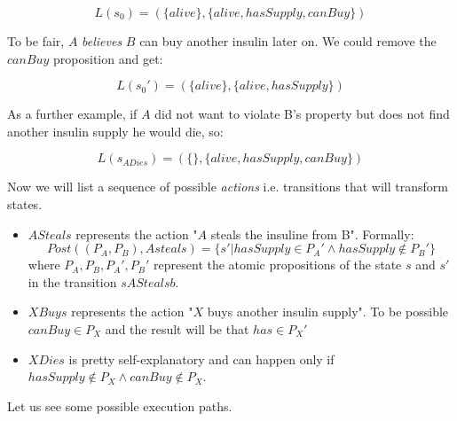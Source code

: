 \documentclass{article}
\begin{document}
\begin{equation*}
    L(s_0) = (\{alive\}, \{alive, hasSupply, canBuy\})
\end{equation*}

To be fair, $A$ \textit{believes} $B$ can buy another insulin later on. We could remove the $canBuy$ proposition and get:

\begin{equation*}
    L(s_0') = (\{alive\}, \{alive, hasSupply\})
\end{equation*}

As a further example, if $A$ did not want to violate B's property but does not find another insulin supply he would die, so:

\begin{equation*}
    L(s_{ADies}) = (\{\}, \{alive, hasSupply, canBuy\})
\end{equation*}

Now we will list a sequence of possible \textit{actions} i.e. transitions that will transform states.

\begin{itemize}
    \item $ASteals$ represents the action "$A$ steals the insuline from B". Formally:
    \begin{equation}
        Post((P_A, P_B), Asteals) = \{s' | hasSupply \in P_A' \wedge hasSupply \not \in P_B'\} 
    \end{equation}
    where $P_A, P_B, P_A', P_B'$ represent the atomic propositions of the state $s$ and $s'$ in the transition $s ASteals b$.
    \item $XBuys$ represents the action "$X$ buys another insulin supply". To be possible $canBuy \in P_X$ and the result will be that $has \in P_X'$
    \item $XDies$ is pretty self-explanatory and can happen only if $hasSupply \not \in P_X \wedge canBuy \not \in P_X$.
\end{itemize}

Let us see some possible execution paths.
\end{document}
